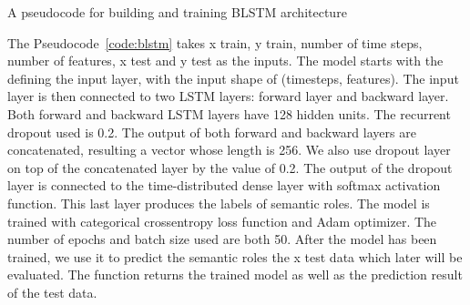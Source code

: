 \begin{kode}
	
	
	\caption{A pseudocode for building and training BLSTM architecture}
	\label{code:blstm}
\end{kode}

The Pseudocode~\ref{code:blstm} takes x train, y train, number of time steps, number of features, x test and y test as the inputs. The model starts with the defining the input layer, with the input shape of (timesteps, features). The input layer is then connected to two LSTM layers: forward layer and backward layer. Both forward and backward LSTM layers have 128 hidden units. The recurrent dropout used is 0.2. The output of both forward and backward layers are concatenated, resulting a vector whose length is 256. We also use dropout layer on top of the concatenated layer by the value of 0.2. The output of the dropout layer is connected to the time-distributed dense layer with softmax activation function. This last layer produces the labels of semantic roles. The model is trained with categorical crossentropy loss function and Adam optimizer. The number of epochs and batch size used are both 50. After the model has been trained, we use it to predict the semantic roles the x test data which later will be evaluated. The function returns the trained model as well as the prediction result of the test data.

